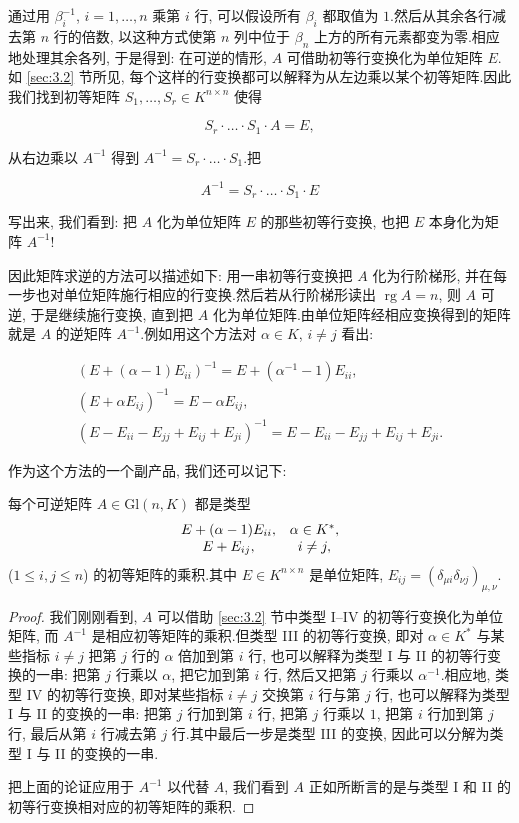 通过用 $\beta_i^{-1}$, $i = 1, \ldots, n$ 乘第 $i$ 行, 可以假设所有 $\beta_i$ 都取值为 $1$.然后从其余各行减去第 $n$ 行的倍数, 以这种方式使第 $n$ 列中位于 $\beta_n$ 上方的所有元素都变为零.相应地处理其余各列, 于是得到: 在可逆的情形, $A$ 可借助初等行变换化为单位矩阵 $E$.如 \ref{sec:3.2} 节所见, 每个这样的行变换都可以解释为从左边乘以某个初等矩阵.因此我们找到初等矩阵 $S_1, \ldots, S_r \in K^{n \times n}$ 使得

\[
S_r \cdot \ldots \cdot S_1 \cdot A = E,
\]

从右边乘以 $A^{-1}$ 得到 $A^{-1} = S_r \cdot \ldots \cdot S_1$.把

\[
A^{-1} = S_r \cdot \ldots \cdot S_1 \cdot E
\]

写出来, 我们看到: 把 $A$ 化为单位矩阵 $E$ 的那些初等行变换, 也把 $E$ 本身化为矩阵 $A^{-1}$!

因此矩阵求逆的方法可以描述如下: 用一串初等行变换把 $A$ 化为行阶梯形, 并在每一步也对单位矩阵施行相应的行变换.然后若从行阶梯形读出 $\operatorname{rg} A = n$, 则 $A$ 可逆, 于是继续施行变换, 直到把 $A$ 化为单位矩阵.由单位矩阵经相应变换得到的矩阵就是 $A$ 的逆矩阵 $A^{-1}$.例如用这个方法对 $\alpha \in K$, $i \neq j$ 看出:

\[
\begin{array}{r}
\left(E + (\alpha - 1)E_{ii}\right)^{-1} = E + (\alpha^{-1} - 1)E_{ii}, \\
(E + \alpha E_{ij})^{-1} = E - \alpha E_{ij}, \\
(E - E_{ii} - E_{jj} + E_{ij} + E_{ji})^{-1} = E - E_{ii} - E_{jj} + E_{ij} + E_{ji}\text{.}
\end{array}
\]

作为这个方法的一个副产品, 我们还可以记下:

\begin{theorem}\label{thm:3.3.8}
每个可逆矩阵 $A \in \mathrm{Gl}(n, K)$ 都是类型
\[
\begin{array}{c c}
E + (\alpha - 1)E_{ii}, & \alpha \in K^*, \\
E + E_{ij}, & i \neq j,
\end{array}
\]
($1 \leq i, j \leq n$) 的初等矩阵的乘积.其中 $E \in K^{n \times n}$ 是单位矩阵, $E_{ij} = (\delta_{\mu i}\delta_{\nu j})_{\mu, \nu}$.
\end{theorem}

\begin{proof}
我们刚刚看到, $A$ 可以借助 \ref{sec:3.2} 节中类型 I--IV 的初等行变换化为单位矩阵, 而 $A^{-1}$ 是相应初等矩阵的乘积.但类型 III 的初等行变换, 即对 $\alpha \in K^*$ 与某些指标 $i \neq j$ 把第 $j$ 行的 $\alpha$ 倍加到第 $i$ 行, 也可以解释为类型 I 与 II 的初等行变换的一串: 把第 $j$ 行乘以 $\alpha$, 把它加到第 $i$ 行, 然后又把第 $j$ 行乘以 $\alpha^{-1}$.相应地, 类型 IV 的初等行变换, 即对某些指标 $i \neq j$ 交换第 $i$ 行与第 $j$ 行, 也可以解释为类型 I 与 II 的变换的一串: 把第 $j$ 行加到第 $i$ 行, 把第 $j$ 行乘以 $1$, 把第 $i$ 行加到第 $j$ 行, 最后从第 $i$ 行减去第 $j$ 行.其中最后一步是类型 III 的变换, 因此可以分解为类型 I 与 II 的变换的一串.

把上面的论证应用于 $A^{-1}$ 以代替 $A$, 我们看到 $A$ 正如所断言的是与类型 I 和 II 的初等行变换相对应的初等矩阵的乘积.
\end{proof}

